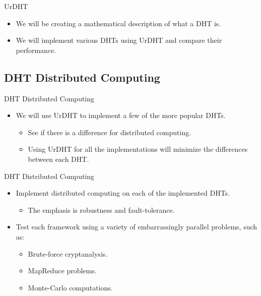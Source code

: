 \documentclass[11pt]{beamer}
\begin{document}
\begin{frame}{UrDHT}
	\begin{itemize}
		\item We will be creating a mathematical description of what a DHT is.
		\item We will implement various DHTs using UrDHT and compare their performance.

	\end{itemize}
\end{frame}





\subsection{DHT Distributed Computing}
\begin{frame}{DHT Distributed Computing}
	\begin{itemize}
			\item We will use UrDHT to implement a few of the more popular DHTs.
			\begin{itemize}
				\item See if there is a difference for distributed computing.
				\item Using UrDHT for all the implementations will minimize the differences between each DHT.	
			\end{itemize}
		
	\end{itemize}
\end{frame}


\begin{frame}{DHT Distributed Computing}
	\begin{itemize}
			\item Implement distributed computing on each of the implemented DHTs.
			\begin{itemize}
				\item The emphasis is robustness and fault-tolerance.
			\end{itemize}
			\item Test each framework using a variety of embarrassingly parallel problems, such as:
			\begin{itemize}
				\item Brute-force cryptanalysis.
				\item MapReduce problems.
				\item Monte-Carlo computations.
			\end{itemize}
	\end{itemize}
\end{frame}
\end{document}
